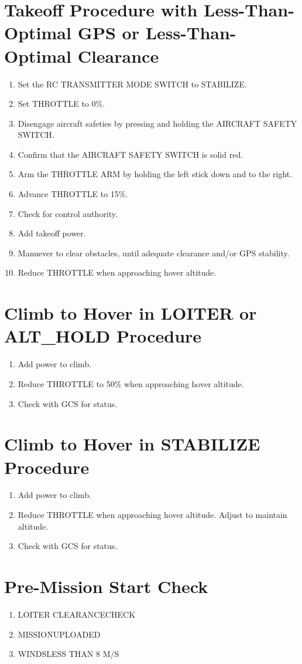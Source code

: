 \documentclass{report}
\begin{document}
	\section{Takeoff Procedure with Less-Than-Optimal GPS or Less-Than-Optimal Clearance}
		\begin{enumerate}
			\item Set the RC TRANSMITTER MODE SWITCH to STABILIZE.
			\item Set THROTTLE to 0\%.
			\item Disengage aircraft safeties by pressing and holding the AIRCRAFT SAFETY SWITCH.
			\item Confirm that the AIRCRAFT SAFETY SWITCH is solid red.
			\item Arm the THROTTLE ARM by holding the left stick down and to the right.
			\item Advance THROTTLE to 15\%.
			\item Check for control authority.
			\item Add takeoff power.
			\item Manuever to clear obstacles, until adequate clearance and/or GPS stability.
			\item Reduce THROTTLE when approaching hover altitude.
		\end{enumerate}
	\section{Climb to Hover in LOITER or ALT\_HOLD Procedure}
		\begin{enumerate}
			\item Add power to climb.
			\item Reduce THROTTLE to 50\% when approaching hover altitude.
			\item Check with GCS for status.
		\end{enumerate}
	\section{Climb to Hover in STABILIZE Procedure}
		\begin{enumerate}
			\item Add power to climb.
			\item Reduce THROTTLE when approaching hover altitude.  Adjust to maintain altitude.
			\item Check with GCS for status.
		\end{enumerate}
	\section{Pre-Mission Start Check}
		\begin{enumerate}
			\item LOITER CLEARANCE\hrulefill CHECK
			\item MISSION\hrulefill UPLOADED
			\item WINDS\hrulefill LESS THAN 8 M/S
		\end{enumerate}
\end{document}
